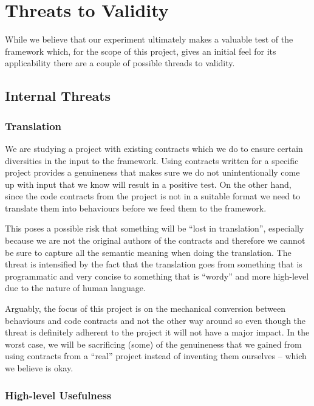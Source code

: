 \section{Threats to Validity}

While we believe that our experiment ultimately makes a valuable test of the framework which, for the scope of this project, gives an initial feel for its applicability there are a couple of possible threads to validity.

\subsection{Internal Threats}
\label{sub:Internal Threats}

\subsubsection{Translation}
\label{sub:Translation}

We are studying a project with existing contracts which we do to ensure certain diversities in the input to the framework. Using contracts written for a specific project provides a genuineness that makes sure we do not unintentionally come up with input that we know will result in a positive test. On the other hand, since the code contracts from the project is not in a suitable format we need to translate them into behaviours before we feed them to the framework.
 
This poses a possible risk that something will be “lost in translation”, especially because we are not the original authors of the contracts and therefore we cannot be sure to capture all the semantic meaning when doing the translation. The threat is intensified by the fact that the translation goes from something that is programmatic and very concise to something that is “wordy” and more high-level due to the nature of human language.
 
Arguably, the focus of this project is on the mechanical conversion between behaviours and code contracts and not the other way around so even though the threat is definitely adherent to the project it will not have a major impact. In the worst case, we will be sacrificing (some) of the genuineness that we gained from using contracts from a “real” project instead of inventing them ourselves – which we believe is okay.

\subsubsection{High-level Usefulness}
\label{sub:High-level Usefulness}

